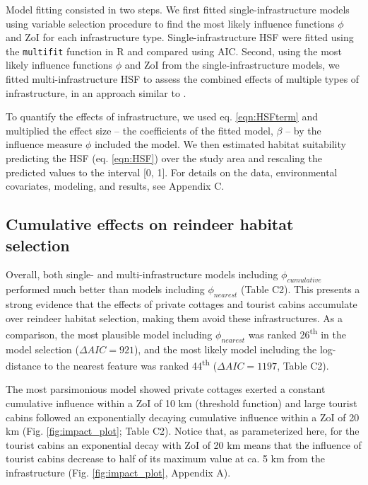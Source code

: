 \documentclass[titlepage]{article}
\begin{document}
Model fitting consisted in two steps. We first fitted single-infrastructure models using variable selection procedure \citep{burnham_model_2002} to find the most likely influence functions $\phi$ and ZoI for each infrastructure type. Single-infrastructure HSF were fitted using the \verb|multifit| function in R \citep{huais_multifit_2018} and compared using AIC. Second, using the most likely influence functions $\phi$ and ZoI from the single-infrastructure models, we fitted multi-infrastructure HSF to assess the combined effects of multiple types of infrastructure, in an approach similar to \citet{laforge_process-focussed_2015}. 

To quantify the effects of infrastructure, we used eq. \ref{eqn:HSFterm} and multiplied the effect size -- the coefficients of the fitted model, $\beta$ -- by the influence measure $\phi$ included the model. We then estimated habitat suitability predicting the HSF (eq. \ref{eqn:HSF}) over the study area and rescaling the predicted values to the interval [0, 1]. For details on the data, environmental covariates, modeling, and results, see Appendix C.

\subsection{Cumulative effects on reindeer habitat selection}

Overall, both single- and multi-infrastructure models including $\phi_{cumulative}$ performed much better than models including $\phi_{nearest}$ (Table C2). This presents a strong evidence that the effects of private cottages and tourist cabins accumulate over reindeer habitat selection, making them avoid these infrastructures. As a comparison, the most plausible model including $\phi_{nearest}$ was ranked 26\textsuperscript{th} in the model selection ($\Delta AIC = 921$), and the most likely model including the log-distance to the nearest feature was ranked 44\textsuperscript{th} ($\Delta AIC = 1197$, Table C2).

The most parsimonious model showed private cottages exerted a constant cumulative influence within a ZoI of 10 km (threshold function) and large tourist cabins followed an exponentially decaying cumulative influence within a ZoI of 20 km (Fig. \ref{fig:impact_plot}; Table C2). Notice that, as parameterized here, for the tourist cabins an exponential decay with ZoI of 20 km means
that the influence of tourist cabins decrease to half of its maximum value
at ca. 5 km from the infrastructure (Fig. \ref{fig:impact_plot}, Appendix A). 
\end{document}

